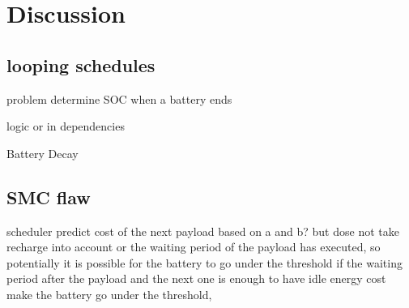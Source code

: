 \section{Discussion} \label{sec:discussion}

\subsection{looping schedules}
problem determine SOC when a battery ends 

logic or in dependencies

Battery Decay

\subsection{SMC flaw}
scheduler predict cost of the next payload based on a and b? but dose not take recharge into account or the waiting period of the payload has executed, so potentially it is possible for the battery to go under the threshold if the waiting period after the payload and the next one is enough to have idle energy cost make the battery go under the threshold,  
